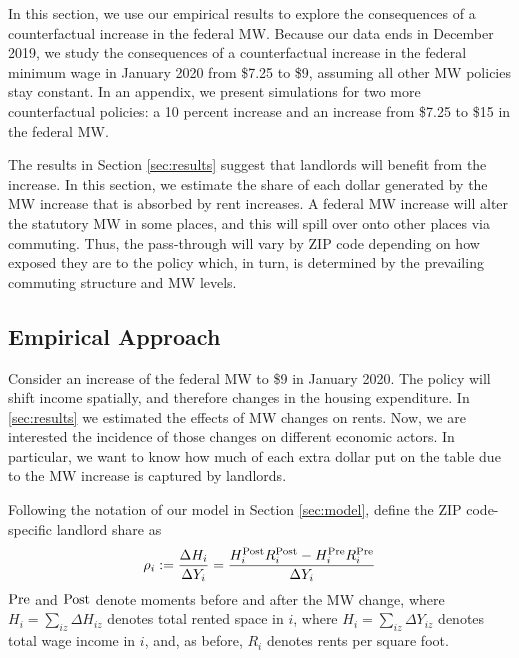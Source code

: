 
In this section, we use our empirical results to explore the consequences of 
a counterfactual increase in the federal MW.
Because our data ends in December 2019, we study the consequences of a 
counterfactual increase in the federal minimum wage in January 2020 from 
\$7.25 to \$9, assuming all other MW policies stay constant. 
In an appendix, we present simulations for two more counterfactual policies: 
a 10 percent increase and an increase from \$7.25 to \$15 in the federal MW.

The results in Section \ref{sec:results} suggest that landlords will benefit
from the increase. 
In this section, we estimate the share of each dollar generated by the MW 
increase that is absorbed by rent increases.
A federal MW increase will alter the statutory MW in some places, and this will
spill over onto other places via commuting.
Thus, the pass-through will vary by ZIP code depending on how exposed they
are to the policy which, in turn, is determined by the prevailing commuting
structure and MW levels.


\subsection{Empirical Approach}\label{sec:emp_cf}

Consider an increase of the federal MW to \$9 in January 2020.
The policy will shift income spatially, and therefore changes in 
the housing expenditure.
In \ref{sec:results} we estimated the effects of MW changes on rents.
Now, we are interested the incidence of those changes on different economic
actors.
In particular, we want to know how much of each extra dollar put on the table 
due to the MW increase is captured by landlords.

Following the notation of our model in Section \ref{sec:model}, define the 
ZIP code-specific landlord share as
\begin{equation*}\label{eq:share_landlords}
    \rho_i := \frac{\Delta H_i}{\Delta Y_i} 
            = \frac{H^{\text{Post}}_i R^{\text{Post}}_i - H^{\text{Pre}}_i R^{\text{Pre}}_i}{\Delta Y_i}
\end{equation*}
$\text{Pre}$ and $\text{Post}$ denote moments before and after the MW change,
where $H_i = \sum_{iz}\Delta H_{iz}$ denotes total rented space in $i$, 
where $H_i = \sum_{iz}\Delta Y_{iz}$ denotes total wage income in $i$, 
and, as before,
$R_i$ denotes rents per square foot.

